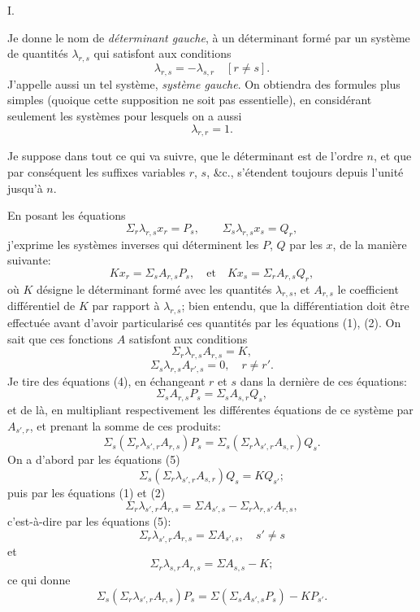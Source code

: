 \documentclass[11pt]{article}
\begin{document}
\medskip
\noindent\textsc{I.}

\smallskip
Je donne le nom de \textit{d\'eterminant gauche}, \`a un d\'eterminant form\'e par un syst\`eme
de quantit\'es $\lambda_{r,s}$ qui satisfont aux conditions
\[
\lambda_{r,s} = -\lambda_{s,r} \quad [r \neq s] \tag{1}.
\]
J'appelle aussi un tel syst\`eme, \textit{syst\`eme gauche}. On obtiendra des formules plus simples
(quoique cette supposition ne soit pas essentielle), en consid\'erant seulement les syst\`emes
pour lesquels on a aussi
\[
\lambda_{r,r} = 1 \tag{2}.
\]

Je suppose dans tout ce qui va suivre, que le d\'eterminant est de l'ordre $n$, et
que par cons\'equent les suffixes variables $r$, $s$, \&c., s'\'etendent toujours depuis l'unit\'e
jusqu'\`a $n$.

\smallskip
En posant les \'equations
\[
\Sigma_{r}\lambda_{r,s} x_{r} = P_{s}, \qquad \Sigma_{s}\lambda_{r,s} x_{s} = Q_{r} \tag{3},
\]
j'exprime les syst\`emes inverses qui d\'eterminent les $P$, $Q$ par les $x$, de la mani\`ere
suivante:
\[
K x_{r} = \Sigma_{s} A_{r,s} P_{s}, \quad \text{et}\quad K x_{s} = \Sigma_{r} A_{r,s} Q_{r} \tag{4},
\]
o\`u $K$ d\'esigne le d\'eterminant form\'e avec les quantit\'es $\lambda_{r,s}$, et $A_{r,s}$ le coefficient
diff\'erentiel de $K$ par rapport \`a $\lambda_{r,s}$; bien entendu, que la diff\'erentiation doit \^etre
effectu\'ee avant d'avoir particularis\'e ces quantit\'es par les \'equations (1), (2). On sait
que ces fonctions $A$ satisfont aux conditions
\[
\Sigma_{r}\lambda_{r,s} A_{r,s} = K,
\]
\[
\Sigma_{s}\lambda_{r,s} A_{r',s} = 0, \quad r \neq r'. \tag{5}
\]
Je tire des \'equations (4), en \'echangeant $r$ et $s$ dans la derni\`ere de ces \'equations:
\[
\Sigma_{s} A_{r,s} P_{s} = \Sigma_{s} A_{s,r} Q_{s} \tag{6},
\]
et de l\`a, en multipliant respectivement les diff\'erentes \'equations de ce syst\`eme par $A_{s',r}$,
et prenant la somme de ces produits:
\[
\Sigma_{s}(\Sigma_{r}\lambda_{s',r} A_{r,s}) P_{s} = \Sigma_{s}(\Sigma_{r}\lambda_{s',r} A_{s,r}) Q_{s} \tag{7}.
\]
On a d'abord par les \'equations (5)
\[
\Sigma_{s}(\Sigma_{r}\lambda_{s',r} A_{s,r}) Q_{s} = K Q_{s'} \tag{8};
\]
puis par les \'equations (1) et (2)
\[
\Sigma_{r}\lambda_{s',r} A_{r,s} = \Sigma A_{s',s} - \Sigma_{r}\lambda_{r,s'} A_{r,s},
\]
c'est-\`a-dire par les \'equations (5):
\[
\Sigma_{r}\lambda_{s',r} A_{r,s} = \Sigma A_{s',s}, \quad s' \neq s
\]
et
\[
\Sigma_{r}\lambda_{s,r} A_{r,s} = \Sigma A_{s,s} - K \tag{10};
\]
ce qui donne
\[
\Sigma_{s}(\Sigma_{r}\lambda_{s',r} A_{r,s}) P_{s} = \Sigma(\Sigma_{s} A_{s',s} P_{s}) - K P_{s'} \tag{11}.
\]
\end{document}
